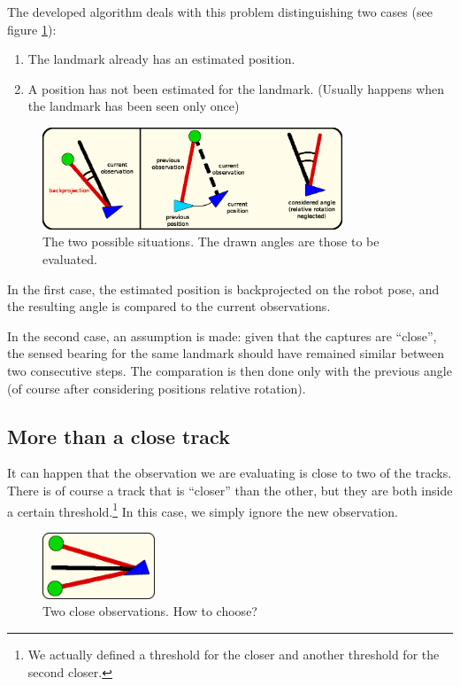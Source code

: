 The developed algorithm deals with this problem distinguishing two cases (see figure \ref{fig:observation_association}):
\begin{enumerate}
  \item The landmark already has an estimated position.
  \item A position has not been estimated for the landmark. (Usually happens when the landmark has been seen only once)
\end{enumerate}
\begin{figure}[htbp]
  \centering
    \includegraphics[width=0.8\textwidth]{images/observation_association.png}
  \caption{The two possible situations. The drawn angles are those to be evaluated.}
  \label{fig:observation_association}
\end{figure}
In the first case, the estimated position is backprojected on the robot pose, and the resulting angle is compared to the current observations.

In the second case, an assumption is made: given that the captures are ``close'', the sensed bearing for the same landmark should have remained similar between two consecutive steps. The comparation is then done only with the previous angle (of course after considering positions relative rotation).

\subsection{More than a close track}\label{subsec:twotracks}
It can happen that the observation we are evaluating is close to two of the tracks. There is of course a track that is ``closer'' than the other, but they are both inside a certain threshold.\footnote{We actually defined a threshold for the closer and another threshold for the second closer.}
In this case, we simply ignore the new observation.

\begin{figure}[htbp]
  \centering
    \includegraphics[width=0.3\textwidth]{images/uncertainty1.png}
  \caption{Two close observations. How to choose?}
  \label{fig:uncertainty1}
\end{figure}

